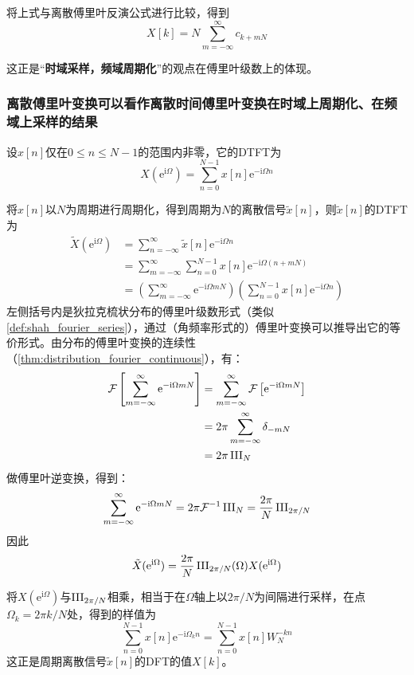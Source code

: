 将上式与离散傅里叶反演公式进行比较，得到
\[X[k]=N\sum_{m=-\infty}^{\infty}c_{k+mN}\]

这正是“\textbf{时域采样，频域周期化}”的观点在傅里叶级数上的体现。

\subsubsection{离散傅里叶变换可以看作离散时间傅里叶变换在时域上周期化、在频域上采样的结果}

设$x[n]$仅在$0\leq n\leq N-1$的范围内非零，它的DTFT为
\[X(\mathrm{e}^{\mathrm{i}\Omega})=\sum_{n=0}^{N-1}x[n]\mathrm{e}^{-\mathrm{i}\Omega n}\]

将$x[n]$以$N$为周期进行周期化，得到周期为$N$的离散信号$\tilde{x}[n]$，则$\tilde{x}[n]$的DTFT为
\begin{align*}
    \tilde{X}(\mathrm{e}^{\mathrm{i}\Omega})&=\sum_{n=-\infty}^{\infty}\tilde{x}[n]\mathrm{e}^{-\mathrm{i}\Omega n}\\
    &=\sum_{m=-\infty}^{\infty}\sum_{n=0}^{N-1}x[n]\mathrm{e}^{-\mathrm{i}\Omega (n+mN)}\\
    &=\left(\sum_{m=-\infty}^{\infty}\mathrm{e}^{-\mathrm{i}\Omega mN}\right)\left(\sum_{n=0}^{N-1}x[n]\mathrm{e}^{-\mathrm{i}\Omega n}\right)
\end{align*}
左侧括号内是狄拉克梳状分布的傅里叶级数形式（类似\cref{def:shah_fourier_series}），通过（角频率形式的）傅里叶变换可以推导出它的等价形式。由分布的傅里叶变换的连续性（\cref{thm:distribution_fourier_continuous}），有：
\begin{align*}
    \mathcal{F}\left[\sum_{m=-\infty}^{\infty}\mathrm{e}^{-\mathrm{i}\Omega mN}\right]&=\sum_{m=-\infty}^{\infty}\mathcal{F}\left[\mathrm{e}^{-\mathrm{i}\Omega mN}\right]\\
    &=2\pi\sum_{m=-\infty}^{\infty}\delta_{-mN}\\
    &=2\pi\operatorname{III}_{N}
\end{align*}
做傅里叶逆变换，得到：\begin{align*}
    \sum_{m=-\infty}^{\infty}\mathrm{e}^{-\mathrm{i}\Omega mN}=2\pi\mathcal{F}^{-1}\operatorname{III}_{N}=\frac{2\pi}{N}\operatorname{III}_{2\pi/N}
\end{align*}
因此\begin{align*}
    \tilde{X}(\mathrm{e}^{\mathrm{i}\Omega})=\frac{2\pi}{N}\operatorname{III}_{2\pi/N}(\Omega)X(\mathrm{e}^{\mathrm{i}\Omega})
\end{align*}

将$X(\mathrm{e}^{\mathrm{i}\Omega})$与$\operatorname{III}_{2\pi/N}$相乘，相当于在$\Omega$轴上以$2\pi/N$为间隔进行采样，在点$\Omega_k=2\pi k/N$处，得到的样值为
$$\sum_{n=0}^{N-1}x[n]\mathrm{e}^{-\mathrm{i}\Omega_k n}=\sum_{n=0}^{N-1}x[n]W_N^{-kn}$$
这正是周期离散信号$\tilde{x}[n]$的DFT的值$X[k]$。

